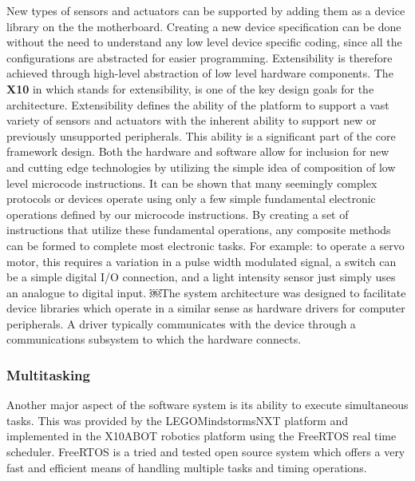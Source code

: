 	New types of sensors and actuators can be supported by adding them as a device library on the the \xten motherboard. Creating a new device specification can be done without the need to understand any low level device specific coding, since all the configurations are abstracted for easier programming. Extensibility is therefore achieved through high-level abstraction of low level hardware components.
	The \textbf{X10} in \xten which stands for extensibility, is one of the key design goals for the architecture. Extensibility defines the ability of the platform to support a vast variety of sensors and actuators with the inherent ability to support new or previously unsupported peripherals. This ability is a significant part of the core framework design. Both the hardware and software allow for inclusion for new and cutting edge technologies by utilizing the simple idea of composition of low level microcode instructions. It can be shown that many seemingly complex protocols or devices operate using only a few simple fundamental electronic operations defined by our microcode instructions\parencite{CITE OR SHOW EXAMPLES}. By creating a set of instructions that utilize these fundamental operations, any composite methods can be formed to complete most electronic tasks. For example: to operate a servo motor, this requires a variation in a pulse width modulated signal, a switch can be a simple digital I/O connection, and a light intensity sensor just simply uses an analogue to digital input. 
	￼The \xten system architecture was designed to facilitate device libraries which operate in a similar sense as hardware drivers for computer peripherals. A driver typically communicates with the device through a communications subsystem to which the hardware connects.	
	
	\subsubsection{Multitasking} %
	\label{ssub:multitasking}
	
	Another major aspect of the software system is its ability to execute simultaneous tasks. This was provided by the LEGO\textregistered Mindstorms\textregistered NXT platform and implemented in the X10ABOT robotics platform using the FreeRTOS real time scheduler. FreeRTOS is a tried and tested open source system which offers a very fast and efficient means of handling multiple tasks and timing operations.
	
